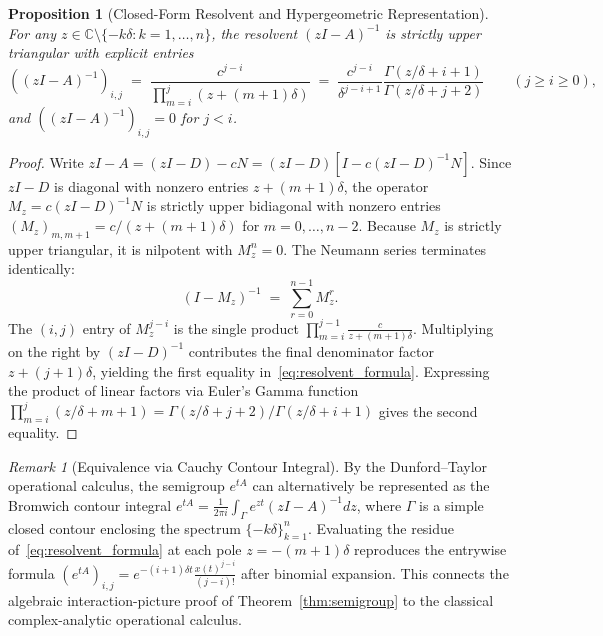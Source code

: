 \documentclass[11pt,reqno]{article}
\theoremstyle{plain}
\newtheorem{proposition}[theorem]{Proposition}
\theoremstyle{definition}
\theoremstyle{remark}
\newtheorem{remark}[theorem]{Remark}
\numberwithin{equation}{section}
\begin{document}
\begin{proposition}[Closed-Form Resolvent and Hypergeometric Representation]\label{prop:resolvent}
For any $z \in \mathbb{C} \setminus \{-k\delta : k = 1, \dots, n\}$, the resolvent $(zI - A)^{-1}$ is strictly upper triangular with explicit entries
\begin{equation}\label{eq:resolvent_formula}
  \left((zI - A)^{-1}\right)_{i,j} \;=\; \frac{c^{j-i}}{\prod_{m=i}^j (z + (m+1)\delta)} \;=\; \frac{c^{j-i}}{\delta^{j-i+1}} \frac{\Gamma(z/\delta + i + 1)}{\Gamma(z/\delta + j + 2)} \qquad (j \ge i \ge 0),
\end{equation}
and $\left((zI - A)^{-1}\right)_{i,j} = 0$ for $j < i$.
\end{proposition}

\begin{proof}
Write $zI - A = (zI - D) - cN = (zI - D)[I - c(zI - D)^{-1}N]$. Since $zI - D$ is diagonal with nonzero entries $z + (m+1)\delta$, the operator $M_z = c(zI - D)^{-1}N$ is strictly upper bidiagonal with nonzero entries $(M_z)_{m,m+1} = c/(z + (m+1)\delta)$ for $m = 0, \dots, n-2$. Because $M_z$ is strictly upper triangular, it is nilpotent with $M_z^n = 0$. The Neumann series terminates identically:
\[
  (I - M_z)^{-1} \;=\; \sum_{r=0}^{n-1} M_z^r.
\]
The $(i,j)$ entry of $M_z^{j-i}$ is the single product $\prod_{m=i}^{j-1} \frac{c}{z + (m+1)\delta}$. Multiplying on the right by $(zI - D)^{-1}$ contributes the final denominator factor $z + (j+1)\delta$, yielding the first equality in~\eqref{eq:resolvent_formula}. Expressing the product of linear factors via Euler's Gamma function $\prod_{m=i}^j (z/\delta + m + 1) = \Gamma(z/\delta + j + 2)/\Gamma(z/\delta + i + 1)$ gives the second equality.
\end{proof}

\begin{remark}[Equivalence via Cauchy Contour Integral]\label{rem:cauchy}
By the Dunford--Taylor operational calculus, the semigroup $e^{tA}$ can alternatively be represented as the Bromwich contour integral $e^{tA} = \frac{1}{2\pi i} \int_\Gamma e^{zt} (zI - A)^{-1} dz$, where $\Gamma$ is a simple closed contour enclosing the spectrum $\{-k\delta\}_{k=1}^n$. Evaluating the residue of~\eqref{eq:resolvent_formula} at each pole $z = -(m+1)\delta$ reproduces the entrywise formula $(e^{tA})_{i,j} = e^{-(i+1)\delta t} \frac{x(t)^{j-i}}{(j-i)!}$ after binomial expansion. This connects the algebraic interaction-picture proof of Theorem~\ref{thm:semigroup} to the classical complex-analytic operational calculus.
\end{remark}
\end{document}
